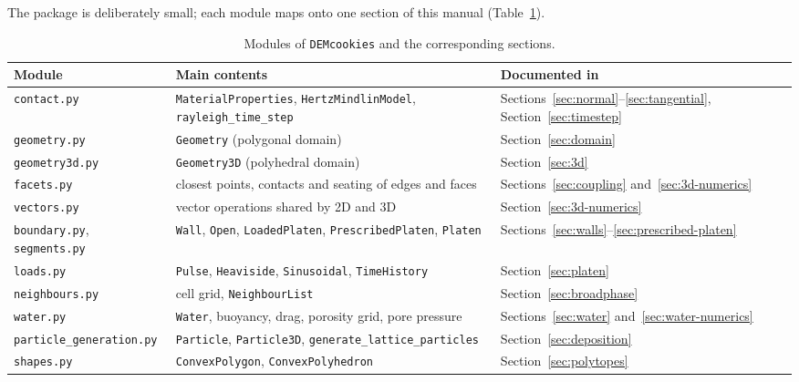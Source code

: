 The package is deliberately small; each module maps onto one section of this
manual (Table~\ref{tab:modules}).

\begin{table}[htbp]
  \centering
  \small
  \caption{Modules of \texttt{DEMcookies} and the corresponding sections.}
  \label{tab:modules}
  \begin{tabular}{l>{\raggedright\arraybackslash}p{4.9cm}>{\raggedright\arraybackslash}p{4.3cm}}
    \toprule
    Module & Main contents & Documented in \\
    \midrule
    \texttt{contact.py} &
      \texttt{MaterialProperties}, \texttt{HertzMindlinModel},
      \texttt{rayleigh\_time\_step} &
      Sections~\ref{sec:normal}--\ref{sec:tangential},
      Section~\ref{sec:timestep} \\
    \texttt{geometry.py} &
      \texttt{Geometry} (polygonal domain) &
      Section~\ref{sec:domain} \\
    \texttt{geometry3d.py} &
      \texttt{Geometry3D} (polyhedral domain) &
      Section~\ref{sec:3d} \\
    \texttt{facets.py} &
      closest points, contacts and seating of edges and faces &
      Sections~\ref{sec:coupling} and~\ref{sec:3d-numerics} \\
    \texttt{vectors.py} &
      vector operations shared by 2D and 3D &
      Section~\ref{sec:3d-numerics} \\
    \texttt{boundary.py}, \texttt{segments.py} &
      \texttt{Wall}, \texttt{Open}, \texttt{LoadedPlaten}, \texttt{PrescribedPlaten}, \texttt{Platen} &
      Sections~\ref{sec:walls}--\ref{sec:prescribed-platen} \\
    \texttt{loads.py} &
      \texttt{Pulse}, \texttt{Heaviside}, \texttt{Sinusoidal},
      \texttt{TimeHistory} &
      Section~\ref{sec:platen} \\
    \texttt{neighbours.py} &
      cell grid, \texttt{NeighbourList} &
      Section~\ref{sec:broadphase} \\
    \texttt{water.py} &
      \texttt{Water}, buoyancy, drag, porosity grid, pore pressure &
      Sections~\ref{sec:water} and~\ref{sec:water-numerics} \\
    \texttt{particle\_generation.py} &
      \texttt{Particle}, \texttt{Particle3D}, \texttt{generate\_lattice\_particles} &
      Section~\ref{sec:deposition} \\
    \texttt{shapes.py} &
      \texttt{ConvexPolygon}, \texttt{ConvexPolyhedron} &
      Section~\ref{sec:polytopes} \\

\end{tabular}
\end{table}
